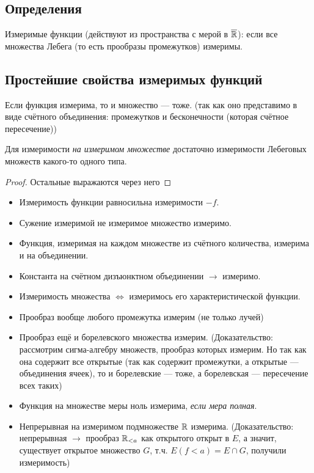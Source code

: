 \documentclass[12pt, a4paper, oneside]{memoir}
\begin{document}
\subsection{Определения}

Измеримые функции (действуют из пространства с мерой в $\overline{{\mathbb{R}}}$):
если все множества Лебега (то есть прообразы промежутков) измеримы.


\subsection{Простейшие свойства измеримых функций}

\begin{claim}
    Если функция измерима, то и множество — тоже.
    (так как оно представимо в виде счётного объединения: промежутков и бесконечности (которая счётное пересечение))
\end{claim}

\begin{lemma}
   Для измеримости \textit{на измеримом множестве} достаточно измеримости Лебеговых множеств какого-то одного типа.

   \begin{proof}
       Остальные выражаются через него 
   \end{proof}
\end{lemma}

\begin{itemize}
    \item Измеримость функции равносильна измеримости $-f$.
    \item Сужение измеримой не измеримое множество измеримо.
    \item Функция, измеримая на каждом множестве из счётного количества, измерима и на объединении.
    \item Константа на счётном дизъюнктном объединении $→$ измеримо.
    \item Измеримость множества $\Leftrightarrow$ измеримось его характеристической функции.
    \item Прообраз вообще любого промежутка измерим (не только лучей)
    \item Прообраз ещё и борелевского множества измерим.
    (Доказательство: рассмотрим сигма-алгебру множеств, прообраз которых измерим. Но так как она содержит все открытые
    (так как содержит промежутки, а открытые — объединения ячеек), то и борелевские — тоже, а борелевская — пересечение всех таких)
    \item Функция на множестве меры ноль измерима, \textit{если мера полная}.
    \item Непрерывная на измеримом подмножестве ${\mathbb{R}}$ измерима.
    (Доказательство: непрерывная $→$ прообраз ${\mathbb{R}}_{< a}$ как открытого открыт в $E$, 
    а значит, существует открытое множество $G$, т.ч. $E(f < a) = E \cap G$, получили измеримость)
\end{itemize}
\end{document}
